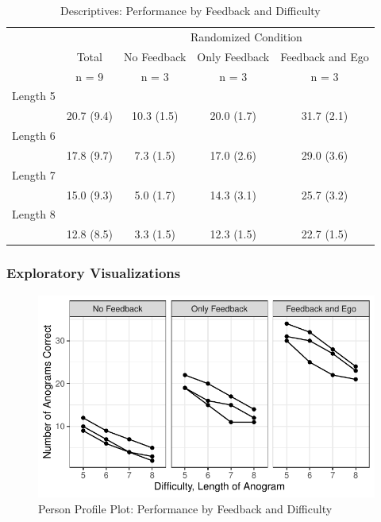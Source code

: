 \documentclass[
]{article}
\begin{document}
\begin{table}[ ht ] 
\centering 
\caption{Descriptives: Performance by Feedback and Difficulty}\label{}
\begin{tabular}{ l c c c c }
\toprule
 &   &  \multicolumn{ 3 }{c}{ Randomized Condition }\\ 
  & Total & No Feedback & Only Feedback & Feedback and Ego \\ 
 & n = 9 & n = 3 & n = 3 & n = 3 \\ 
 \midrule
Length 5 &   &   &   &  \\ 
\hspace{6pt}   & 20.7 (9.4) & 10.3 (1.5) & 20.0 (1.7) & 31.7 (2.1)\\ 
Length 6 &   &   &   &  \\ 
\hspace{6pt}   & 17.8 (9.7) & 7.3 (1.5) & 17.0 (2.6) & 29.0 (3.6)\\ 
Length 7 &   &   &   &  \\ 
\hspace{6pt}   & 15.0 (9.3) & 5.0 (1.7) & 14.3 (3.1) & 25.7 (3.2)\\ 
Length 8 &   &   &   &  \\ 
\hspace{6pt}   & 12.8 (8.5) & 3.3 (1.5) & 12.3 (1.5) & 22.7 (1.5)\\ 
\bottomrule

\end{tabular}
\end{table}

\clearpage

\hypertarget{exploratory-visualizations}{%
\subsubsection{Exploratory
Visualizations}\label{exploratory-visualizations}}

\begin{figure}

{\centering \includegraphics{Chapter-16-Assignment-R-Skeleton_files/figure-latex/unnamed-chunk-12-1} 

}

\caption{Person Profile Plot: Performance by Feedback and Difficulty}\label{fig:unnamed-chunk-12}
\end{figure}
\end{document}
